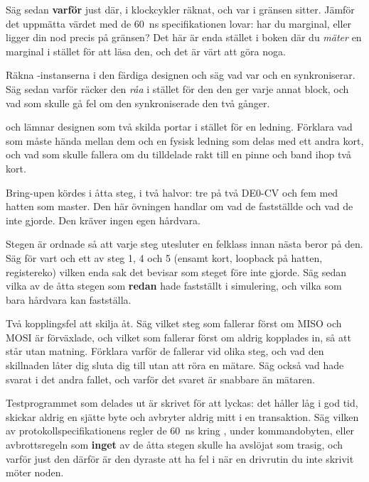 Säg sedan \textbf{varför} just där, i klockcykler räknat, och var i  gränsen sitter.
Jämför det uppmätta värdet med de 60~ns specifikationen lovar: har du marginal, eller ligger din nod
precis på gränsen? Det här är enda stället i boken där du \emph{mäter} en marginal i stället för att
läsa den, och det är värt att göra noga.

 Räkna -instanserna i den färdiga designen och säg vad var och en
synkroniserar. Säg sedan varför  räcker  den \emph{råa}
 i stället för den  den ger varje annat block, och vad som skulle gå
fel om den synkroniserade den två gånger.

  och  lämnar designen som två skilda portar i stället för en
ledning. Förklara vad som måste hända mellan dem och en fysisk ledning som delas med ett andra kort,
och vad som skulle fallera om du tilldelade  rakt till en pinne och band ihop två kort.

\label{c19:ex:board}
Bring-upen kördes i åtta steg, i två halvor: tre på två DE0-CV och fem med hatten som master. Den här
övningen handlar om vad de fastställde och vad de inte gjorde. Den kräver ingen egen hårdvara.

 Stegen är ordnade så att varje steg utesluter en felklass innan nästa beror på den. Säg för
vart och ett av steg 1, 4 och 5 (ensamt kort, loopback på hatten, registereko) vilken enda sak det
bevisar som steget före inte gjorde. Säg sedan vilka av de åtta stegen som 
\textbf{redan} hade fastställt i simulering, och vilka som bara hårdvara kan fastställa.

 Två kopplingsfel att skilja åt. Säg vilket steg som fallerar först om MISO och MOSI är
förväxlade, och vilket som fallerar först om  aldrig kopplades in, så att 
står utan matning. Förklara varför de fallerar vid olika steg, och vad den skillnaden låter dig sluta
dig till utan att röra en mätare. Säg också vad  hade svarat i det andra fallet,
och varför det svaret är snabbare än mätaren.

 Testprogrammet som delades ut är skrivet för att lyckas: det håller  låg i god
tid, skickar aldrig en sjätte byte och avbryter aldrig mitt i en transaktion. Säg vilken av
protokollspecifikationens regler \textemdash{} de 60~ns kring ,  under
kommandobyten, eller avbrottsregeln \textemdash{} som \textbf{inget} av de åtta stegen skulle ha
avslöjat som trasig, och varför just den därför är den dyraste att ha fel i när en drivrutin du inte
skrivit möter noden.

